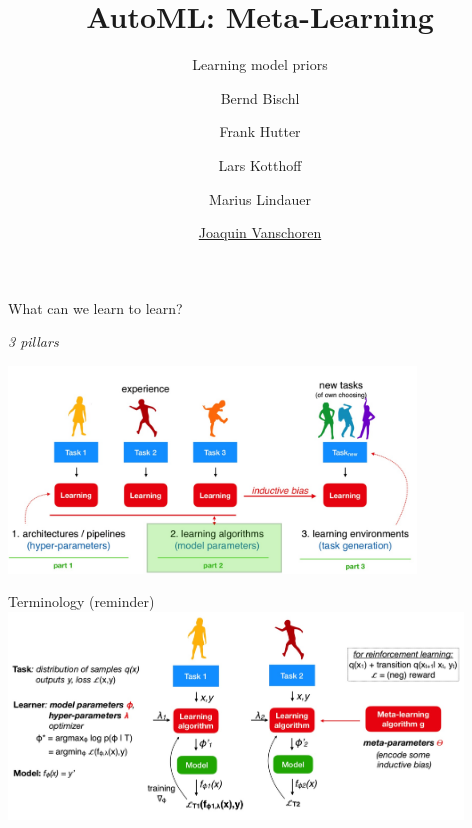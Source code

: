 
\usepackage{multimedia}

\title[Meta-Learning]{AutoML: Meta-Learning} 
\subtitle{Learning model priors}
\author[Joaquin Vanschoren]{Bernd Bischl \and Frank Hutter \and Lars Kotthoff\newline \and Marius Lindauer \and \underline{Joaquin Vanschoren}}
\institute{}
\date{}


\maketitle

\begin{frame}{What can we learn to learn?}
    \centerline{\textit{3 pillars}}
    \centering\includegraphics[height=5.5cm]{image/img000132.jpg}
\end{frame}

\begin{frame}{Terminology (reminder)}
    \centering\includegraphics[height=5.5cm]{image/img000340.jpg}
\end{frame}

